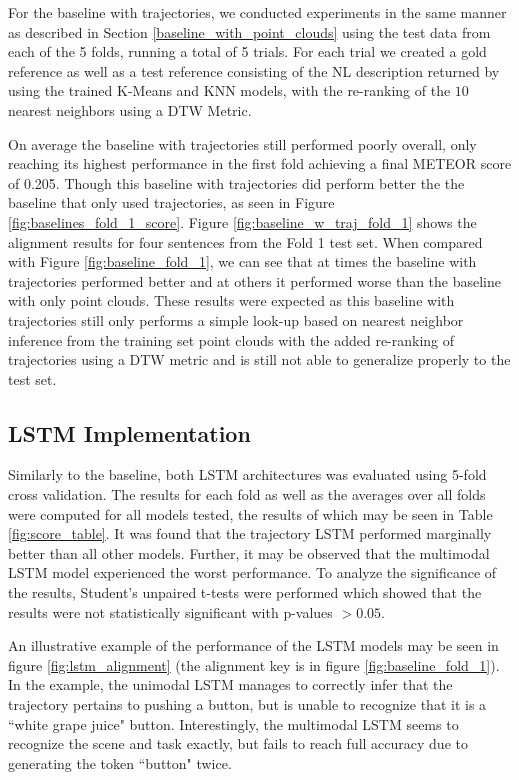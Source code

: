 \documentclass[letterpaper, 12 pt, conference]{ieeeconf}
\begin{document}
For the baseline with trajectories, we conducted experiments in the same manner as described in Section \ref{baseline_with_point_clouds} using the test data from each of the 5 folds, running a total of 5 trials. For each trial we created a gold reference as well as a test reference consisting of the NL description returned by using the trained K-Means and KNN models, with the re-ranking of the $10$ nearest neighbors using a DTW Metric.

On average the baseline with trajectories still performed poorly overall, only reaching its highest performance in the first fold achieving a final METEOR score of 0.205. Though this baseline with trajectories did perform better the the baseline that only used trajectories, as seen in Figure \ref{fig:baselines_fold_1_score}. Figure \ref{fig:baseline_w_traj_fold_1} shows the alignment results for four sentences from the Fold 1 test set. When compared with Figure \ref{fig:baseline_fold_1}, we can see that at times the baseline with trajectories performed better and at others it performed worse than the baseline with only point clouds. These results were expected as this baseline with trajectories still only performs a simple look-up based on nearest neighbor inference from the training set point clouds with the added re-ranking of trajectories using a DTW metric and is still not able to generalize properly to the test set.

\subsection{LSTM Implementation}

Similarly to the baseline, both LSTM architectures was evaluated using 5-fold cross validation. The results for each fold as well as the averages over all folds were computed for all models tested, the results of which may be seen in Table \ref{fig:score_table}. It was found that the trajectory LSTM performed marginally better than all other models. Further, it may be observed that the multimodal LSTM model experienced the worst performance. To analyze the significance of the results, Student's unpaired t-tests were performed which showed that the results were not statistically significant with p-values $> 0.05$.

An illustrative example of the performance of the LSTM models may be seen in figure \ref{fig:lstm_alignment} (the alignment key is in figure \ref{fig:baseline_fold_1}). In the example, the unimodal LSTM manages to correctly infer that the trajectory pertains to pushing a button, but is unable to recognize that it is a ``white grape juice" button. Interestingly, the multimodal LSTM seems to recognize the scene and task exactly, but fails to reach full accuracy due to generating the token ``button" twice. 
\end{document}
